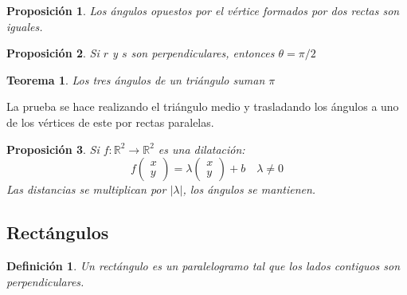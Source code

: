 \documentclass[11pt, a4paper]{article}
\makeatletter
\newif\IfInSansMode
\let\oldsf\sffamily
\renewcommand*{\sffamily}{\oldsf\mathversion{sans}\InSansModetrue}
\let\oldnorm\normalfont
\renewcommand*{\normalfont}{\oldnorm\InSansModefalse\mathversion{normal}}
\renewenvironment{proof}[1][\proofname] {\vspace{-15pt}\par\pushQED{\qed}\normalfont\topsep6\p@\@plus6\p@\relax\trivlist\item[\hskip\labelsep\it#1\@addpunct{.}]\ignorespaces}{\popQED\endtrivlist\@endpefalse}
\newcommand{\R}{\mathbb{R}}
\renewenvironment{proof}[1][\proofname] {\par\pushQED{\qed}\normalfont\topsep6\p@\@plus6\p@\relax\trivlist\item[\hskip\labelsep\itshape\sffamily#1\@addpunct{.}]\ignorespaces}{\popQED\endtrivlist\@endpefalse}
\theoremstyle{theorem-style}
\newtheorem{nth}{Teorema}[section]
\newtheorem{nprop}{Proposición}[section]
\theoremstyle{definition-style}
\newtheorem{ndef}{Definición}[section]
\theoremstyle{remark-style}
\theoremstyle{example-style}
\makeatother
\begin{document}
\begin{nprop}
  Los ángulos opuestos por el vértice formados por dos rectas son iguales.
\end{nprop}


\begin{nprop}
  Si $r$ y $s$ son perpendiculares, entonces $\theta = \pi/2$
\end{nprop}

\begin{nth}
  Los tres ángulos de un triángulo suman $\pi$
\end{nth}
\begin{proof}
  La prueba se hace realizando el triángulo medio y trasladando los ángulos a uno de los vértices de este por rectas paralelas.
\end{proof}

\begin{nprop}
  Si $f:\R^2 \to \R^2$ es una dilatación:
  \[
    f \begin{pmatrix}
      x\\
      y 
    \end{pmatrix} = \lambda\begin{pmatrix}
      x\\
      y 
    \end{pmatrix} + b \quad \lambda \ne 0
  \]
  Las distancias se multiplican por $|\lambda|$, los ángulos se mantienen.
\end{nprop}




\subsection{Rectángulos}
\begin{ndef}
  Un rectángulo es un paralelogramo tal que los lados contiguos son perpendiculares.
\end{ndef}
\end{document}
